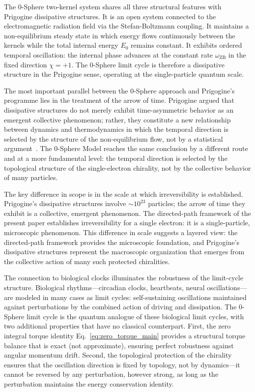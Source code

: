 \documentclass[%
 reprint, amsmath,amssymb, aps, prb, ]{revtex4-2}
\numberwithin{equation}{section}
\newcommand{\omZB}{\omega_{\text{ZB}}}
\begin{document}
The 0-Sphere two-kernel system shares all three structural features with Prigogine dissipative structures. It is an open system connected to the electromagnetic radiation field via the Stefan-Boltzmann coupling. It maintains a non-equilibrium steady state in which energy flows continuously between the kernels while the total internal energy $E_0$ remains constant. It exhibits ordered temporal oscillation: the internal phase advances at the constant rate $\omZB$ in the fixed direction $\chi = +1$. The 0-Sphere limit cycle is therefore a dissipative structure in the Prigogine sense, operating at the single-particle quantum scale.

The most important parallel between the 0-Sphere approach and Prigogine's programme lies in the treatment of the arrow of time. Prigogine argued that dissipative structures do not merely exhibit time-asymmetric behavior as an emergent collective phenomenon; rather, they constitute a new relationship between dynamics and thermodynamics in which the temporal direction is selected by the structure of the non-equilibrium flow, not by a statistical argument~\cite{Prigogine1984, Lebowitz1993}. The 0-Sphere Model reaches the same conclusion by a different route and at a more fundamental level: the temporal direction is selected by the topological structure of the single-electron chirality, not by the collective behavior of many particles.

The key difference in scope is in the scale at which irreversibility is established. Prigogine's dissipative structures involve $\sim 10^{23}$ particles; the arrow of time they exhibit is a collective, emergent phenomenon. The directed-path framework of the present paper establishes irreversibility for a single electron: it is a single-particle, microscopic phenomenon. This difference in scale suggests a layered view: the directed-path framework provides the microscopic foundation, and Prigogine's dissipative structures represent the macroscopic organization that emerges from the collective action of many such protected chiralities.

The connection to biological clocks illuminates the robustness of the limit-cycle structure. Biological rhythms---circadian clocks, heartbeats, neural oscillations---are modeled in many cases as limit cycles: self-sustaining oscillations maintained against perturbations by the combined action of driving and dissipation. The 0-Sphere limit cycle is the quantum analogue of these biological limit cycles, with two additional properties that have no classical counterpart. First, the zero integral torque identity Eq.~\eqref{eq:zero_torque_main} provides a structural torque balance that is exact (not approximate), ensuring perfect robustness against angular momentum drift. Second, the topological protection of the chirality ensures that the oscillation direction is fixed by topology, not by dynamics---it cannot be reversed by any perturbation, however strong, as long as the perturbation maintains the energy conservation identity.
\end{document}
